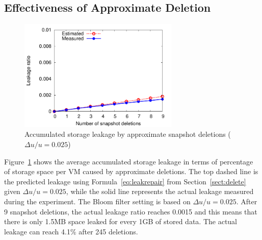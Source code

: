  \subsection{Effectiveness of Approximate Deletion}

 \begin{figure}
     \centering
     \includegraphics[width=3in]{figures/leakage}
     \caption{Accumulated storage leakage by approximate snapshot deletions ($\Delta u/u=0.025$)}
     \label{fig:leakage}
 \end{figure}

Figure~\ref{fig:leakage} shows the average accumulated storage leakage in terms of percentage of
storage space per VM caused  by approximate deletions.
The top dashed line is the predicted leakage using Formula~\ref{eq:leakrepair} from Section~\ref{sect:delete}
given $\Delta u/u=0.025$,
while the solid line represents the actual leakage measured during the experiment. 
The Bloom filter setting is based on $\Delta u/u=0.025$.
After 9 snapshot deletions, the actual leakage ratio reaches 0.0015 and this means that
there is only 1.5MB space leaked for every 1GB of stored data.
The actual leakage can reach  4.1\% after  245 deletions.
